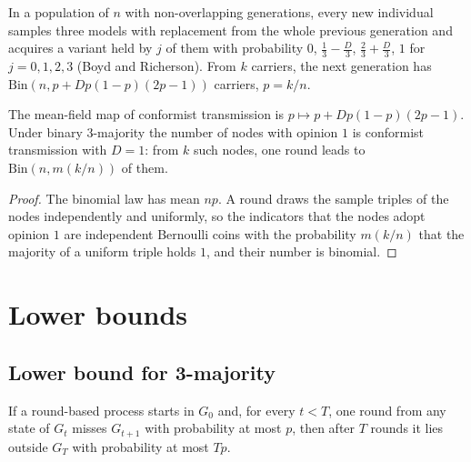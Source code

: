 \begin{definition}\label{def:conformist}
  \leanok
  In a population of $n$ with non-overlapping generations, every new individual samples three
  models with replacement from the whole previous generation and acquires a variant held by $j$ of
  them with probability $0$, $\frac13 - \frac D3$, $\frac23 + \frac D3$, $1$ for $j = 0,1,2,3$
  (Boyd and Richerson). From $k$ carriers, the next generation has
  $\mathrm{Bin}(n, p + Dp(1-p)(2p-1))$ carriers, $p = k/n$.
\end{definition}

\begin{theorem}[Binary 3-majority is conformist transmission with $D = 1$ on counts]\label{thm:conformist}
  \leanok
  The mean-field map of conformist transmission is $p \mapsto p + Dp(1-p)(2p-1)$. Under binary
  3-majority the number of nodes with opinion $1$ is conformist transmission with $D = 1$: from
  $k$ such nodes, one round leads to $\mathrm{Bin}(n, m(k/n))$ of them.
\end{theorem}
\begin{proof}
  \leanok
  The binomial law has mean $np$. A round draws the sample triples of the nodes independently and
  uniformly, so the indicators that the nodes adopt opinion $1$ are independent Bernoulli coins
  with the probability $m(k/n)$ that the majority of a uniform triple holds $1$, and their number
  is binomial.
\end{proof}

\section{Lower bounds}\label{sec:lower}

\subsection{Lower bound for 3-majority}

\begin{lemma}\label{lem:escape}
  \leanok
  If a round-based process starts in $G_0$ and, for every $t < T$, one round
  from any state of $G_t$ misses $G_{t+1}$ with probability at most $p$, then
  after $T$ rounds it lies outside $G_T$ with probability at most $Tp$.
\end{lemma}

